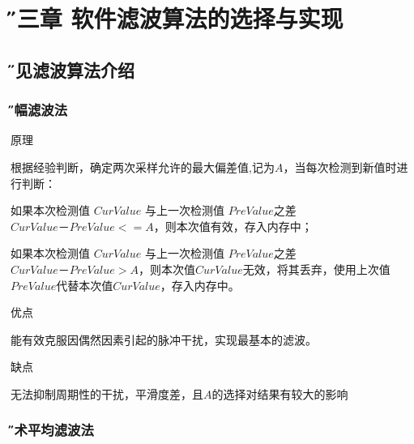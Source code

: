 \documentclass[12pt]{article} %
\newcommand{\xiaosanhao}{\fontsize{15pt}{\baselineskip}\selectfont}    %
\begin{document}
		




 \section{\xiaosanhao \H 第三章 \quad 软件滤波算法的选择与实现}
 
 
 	\subsection{\H 常见滤波算法介绍}
 	
 		\subsubsection{\H 限幅滤波法} 
 		\begin{compactitem} 
 			\item 原理
 			\par 根据经验判断，确定两次采样允许的最大偏差值,记为$A$，当每次检测到新值时进行判断：
 			\par 如果本次检测值  $CurValue$ 与上一次检测值 $PreValue $之差$CurValue－PreValue <= A$，则本次值有效，存入内存中；
 			\par 如果本次检测值  $CurValue$ 与上一次检测值 $PreValue $之差$CurValue－PreValue >A$，则本次值$CurValue$无效，将其丢弃，使用上次值$PreValue $代替本次值$CurValue$，存入内存中。
			
			\item 优点
			\par 能有效克服因偶然因素引起的脉冲干扰，实现最基本的滤波。
			
			\item 缺点
			\par 无法抑制周期性的干扰，平滑度差，且$A$的选择对结果有较大的影响
			
		 \end{compactitem}	
		 
 		\subsubsection{\H 算术平均滤波法} 
 		
\end{document}

